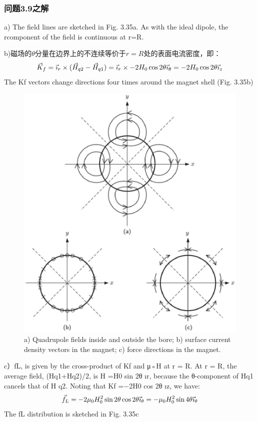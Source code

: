 \subsubsection{问题3.9之解}
a) The field lines are sketched in Fig. 3.35a. As with the ideal dipole, the rcomponent of the field is continuous at r=R.

b)磁场的$\theta$分量在边界上的不连续等价于$r=R$处的表面电流密度，即：
$$\vec{K}_{f}=\vec{\imath}_{r}\times(\vec{H}_{q2}-\vec{H}_{q1})=\vec{\imath}_{r}\times-2H_{0}\cos2\theta\vec{\imath}_{\theta}\\
=-2H_{0}\cos2\theta\vec{\imath}_{z}\\%
$$
The Kf vectors change directions four times around the magnet shell (Fig. 3.35b)
\begin{figure}[htbp]
	\centering
	\includegraphics[scale=0.5]{chpt3/figs/fig3.35.eps}
	\caption{a) Quadrupole fields inside and outside the bore; b) surface current
		density vectors in the magnet; c) force directions in the magnet.}
\end{figure}

c）fL, is given by the cross-product of Kf and μ◦H at r = R. At r = R, the
average field, (Hq1+Hq2)/2, is H =H0 sin 2θ	ır, because the θ-component of Hq1
cancels that of H
q2. Noting that Kf =−2H0 cos 2θ	ız, we have:
$$
\vec{f}_{L}=-2\mu_{0}H_{0}^{2}\sin2\theta \cos2\theta\vec{\imath}_{\theta}\\
=-\mu_{0}H_{0}^{2}\sin4\theta\vec{\imath}_{\theta}\\%
$$
The fL distribution is sketched in Fig. 3.35c

